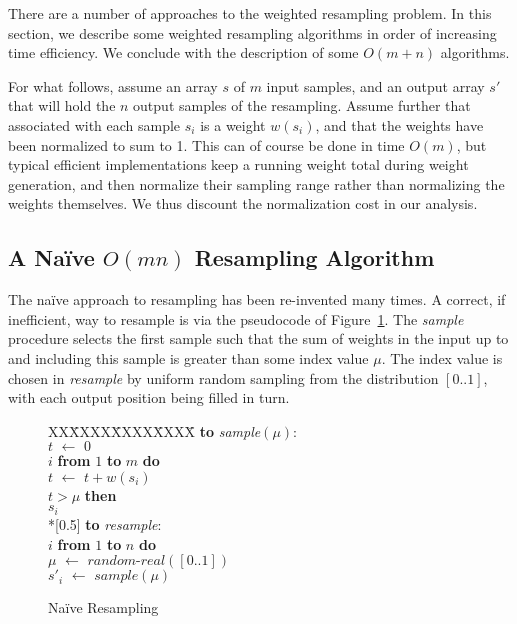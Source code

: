 \documentclass[12pt]{article}
\newcommand{\asgn}{\,\,\leftarrow\,\,}
\newcommand{\newcode}{\\*[0.5\baselineskip]}
\begin{document}
  There are a number of approaches to the weighted
  resampling problem.  In this section, we describe some
  weighted resampling algorithms in order of increasing time
  efficiency.  We conclude with the description of some
  $O(m + n)$ algorithms.

  For what follows, assume an array $s$ of $m$ input
  samples, and an output array $s'$ that will hold the $n$
  output samples of the resampling.  Assume further that
  associated with each sample $s_i$ is a weight $w(s_i)$,
  and that the weights have been normalized to sum to 1.
  This can of course be done in time $O(m)$, but typical
  efficient implementations keep a running weight total
  during weight generation, and then normalize their
  sampling range rather than normalizing the weights
  themselves.  We thus discount the normalization cost in
  our analysis.

\subsection{A Na\"ive $O(mn)$ Resampling Algorithm}\label{sec-naive}

  The na\"ive approach to resampling has been re-invented
  many times.  A correct, if inefficient, way to resample is
  via the pseudocode of Figure~\ref{fig-omn}.  The {\em
  sample} procedure selects the first sample such that the
  sum of weights in the input up to and including this
  sample is greater than some index value $\mu$.  The index
  value is chosen in {\em resample} by uniform random
  sampling from the distribution $[0..1]$, with each output
  position being filled in turn.

  \begin{figure}
    \centering
    \begin{minipage}{0.6\textwidth}
      \begin{tabbing}
      XX\=XXXX\=XXXX\=XXXX\=\kill
      {\bf to} {\it sample}$(\mu)$: \\
      \>$t \asgn 0$ \\
       $i$ {\bf from} $1$ {\bf to} $m$ {\bf do} \\
      \>\>$t \asgn t + w(s_i)$ \\
      \> $t > \mu$ {\bf then} \\
      \>\> $s_i$ \newcode
      {\bf to} {\it resample}: \\
       $i$ {\bf from} $1$ {\bf to} $n$ {\bf do} \\
      \>\>$\mu \asgn \textit{random-real}([0..1])$ \\
      \>\>$s'_i \asgn sample(\mu)$
      \end{tabbing}
    \end{minipage}
    \caption{Na\"ive Resampling}\label{fig-omn}
  \end{figure}
\end{document}
